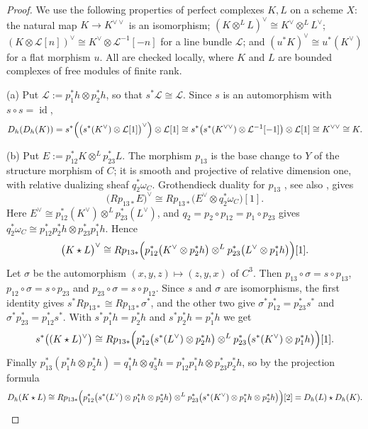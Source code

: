 \documentclass[11pt]{amsart}
\theoremstyle{definition}
\theoremstyle{remark}
\newcommand{\id}{\operatorname{id}}
\begin{document}
\begin{proof}
We use the following properties of perfect complexes $K,L$ on a scheme $X$:
the natural map $K\to K^{\vee\vee}$ is an isomorphism;
$(K\otimes^{L}L)^{\vee}\cong K^{\vee}\otimes^{L}L^{\vee}$;
$(K\otimes\mathcal L[n])^{\vee}\cong K^{\vee}\otimes\mathcal L^{-1}[-n]$ for
a line bundle $\mathcal L$; and $(u^{*}K)^{\vee}\cong u^{*}(K^{\vee})$ for a
flat morphism $u$.  All are checked locally, where $K$ and $L$ are bounded
complexes of free modules of finite rank.

(a)  Put $\mathcal L:=p_1^{*}h\otimes p_2^{*}h$, so that
$s^{*}\mathcal L\cong\mathcal L$.  Since $s$ is an automorphism with
$s\circ s=\id$,
\[
D_h(D_h(K))=s^{*}\Bigl(\bigl(s^{*}(K^{\vee})\otimes\mathcal L[1]\bigr)^{\vee}
\Bigr)\otimes\mathcal L[1]
\cong s^{*}\bigl(s^{*}(K^{\vee\vee})\otimes\mathcal L^{-1}[-1]\bigr)
\otimes\mathcal L[1]\cong K^{\vee\vee}\cong K .
\]

(b)  Put $E:=p_{12}^{*}K\otimes^{L}p_{23}^{*}L$.  The morphism $p_{13}$ is the
base change to $Y$ of the structure morphism of $C$; it is smooth and
projective of relative dimension one, with relative dualizing sheaf
$q_2^{*}\omega_C$.  Grothendieck duality for $p_{13}$
\cite[Ch.~VII, Theorem~3.3 and Corollary~3.4]{HartshorneRD}, see also
\cite[Theorem~3.34]{Huybrechts}, gives
\[
\bigl(Rp_{13*}E\bigr)^{\vee}\cong
Rp_{13*}\bigl(E^{\vee}\otimes q_2^{*}\omega_C\bigr)[1].
\]
Here $E^{\vee}\cong p_{12}^{*}(K^{\vee})\otimes^{L}p_{23}^{*}(L^{\vee})$, and
$q_2=p_2\circ p_{12}=p_1\circ p_{23}$ gives
$q_2^{*}\omega_C\cong p_{12}^{*}p_2^{*}h\otimes p_{23}^{*}p_1^{*}h$.  Hence
\[
\bigl(K\star L\bigr)^{\vee}\cong Rp_{13*}\Bigl(
p_{12}^{*}\bigl(K^{\vee}\otimes p_2^{*}h\bigr)\otimes^{L}
p_{23}^{*}\bigl(L^{\vee}\otimes p_1^{*}h\bigr)\Bigr)[1].
\]
Let $\sigma$ be the automorphism $(x,y,z)\mapsto(z,y,x)$ of $C^{3}$.  Then
$p_{13}\circ\sigma=s\circ p_{13}$, $p_{12}\circ\sigma=s\circ p_{23}$ and
$p_{23}\circ\sigma=s\circ p_{12}$.  Since $s$ and $\sigma$ are isomorphisms,
the first identity gives $s^{*}Rp_{13*}\cong Rp_{13*}\sigma^{*}$, and the
other two give $\sigma^{*}p_{12}^{*}=p_{23}^{*}s^{*}$ and
$\sigma^{*}p_{23}^{*}=p_{12}^{*}s^{*}$.  With $s^{*}p_1^{*}h=p_2^{*}h$ and
$s^{*}p_2^{*}h=p_1^{*}h$ we get
\[
s^{*}\bigl((K\star L)^{\vee}\bigr)\cong Rp_{13*}\Bigl(
p_{12}^{*}\bigl(s^{*}(L^{\vee})\otimes p_2^{*}h\bigr)\otimes^{L}
p_{23}^{*}\bigl(s^{*}(K^{\vee})\otimes p_1^{*}h\bigr)\Bigr)[1].
\]
Finally
$p_{13}^{*}(p_1^{*}h\otimes p_2^{*}h)=q_1^{*}h\otimes q_3^{*}h
=p_{12}^{*}p_1^{*}h\otimes p_{23}^{*}p_2^{*}h$, so by the projection formula
\[
D_h(K\star L)\cong Rp_{13*}\Bigl(
p_{12}^{*}\bigl(s^{*}(L^{\vee})\otimes p_1^{*}h\otimes p_2^{*}h\bigr)
\otimes^{L}
p_{23}^{*}\bigl(s^{*}(K^{\vee})\otimes p_1^{*}h\otimes p_2^{*}h\bigr)\Bigr)[2]
=D_h(L)\star D_h(K).
\]


\end{proof}
\end{document}
